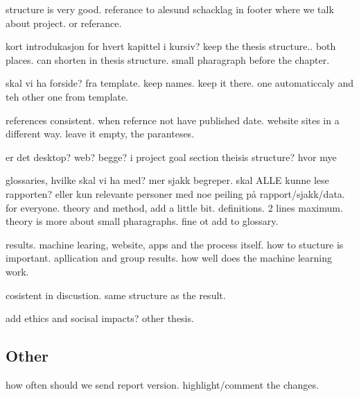 structure is very good. referance to alesund schacklag in footer where we talk about project. or referance.  

kort introdukasjon for hvert kapittel i kursiv? keep the thesis structure.. both places. can shorten in thesis structure. small pharagraph before the chapter. 

skal vi ha forside? fra template. keep names. keep it there. one automaticcaly and teh other one from template. 

references consistent. when refernce not have published date. website sites in a different way. leave it empty, the paranteses.  

er det desktop? web? begge? i project goal section
theisis structure? hvor mye

glossaries, hvilke skal vi ha med? mer sjakk begreper. 
skal ALLE kunne lese rapporten? eller kun relevante personer med noe peiling på rapport/sjakk/data. for everyone. theory and method, add a little bit. definitions. 2 lines maximum. theory is more about small pharagraphs. fine ot add to glossary. 

results. machine learing, website, apps and the process itself. how to stucture is important. apllication and group results. how well does the machine learning work. 

cosistent in discustion. same structure as the result.

add ethics and socisal impacts? other thesis. 

\subsection{Other}
how often should we send report version. highlight/comment the changes. 
